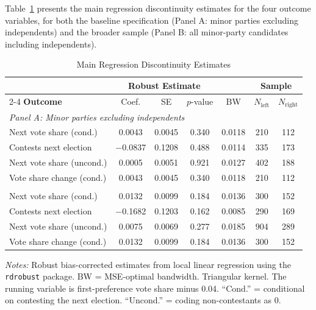 \documentclass[12pt, a4paper]{article}
\begin{document}
Table~\ref{tab:main_results} presents the main regression discontinuity estimates for the four outcome variables, for both the baseline specification (Panel A: minor parties excluding independents) and the broader sample (Panel B: all minor-party candidates including independents).

\begin{table}[H]
\centering
\caption{Main Regression Discontinuity Estimates}
\label{tab:main_results}
\small
\begin{tabular}{lcccccc}
\toprule
& \multicolumn{3}{c}{\textbf{Robust Estimate}} & & \multicolumn{2}{c}{\textbf{Sample}} \\
\cmidrule{2-4} \cmidrule{6-7}
\textbf{Outcome} & Coef. & SE & $p$-value & BW & $N_{\text{left}}$ & $N_{\text{right}}$ \\
\midrule
\multicolumn{7}{l}{\textit{Panel A: Minor parties excluding independents}} \\
\addlinespace
Next vote share (cond.) & 0.0043 & 0.0045 & 0.340 & 0.0118 & 210 & 112 \\
Contests next election & $-$0.0837 & 0.1208 & 0.488 & 0.0114 & 335 & 173 \\
Next vote share (uncond.) & 0.0005 & 0.0051 & 0.921 & 0.0127 & 402 & 188 \\
Vote share change (cond.) & 0.0043 & 0.0045 & 0.340 & 0.0118 & 210 & 112 \\
\addlinespace
\midrule
\multicolumn{7}{l}{\textit{Panel B: All minor parties including independents}} \\
\addlinespace
Next vote share (cond.) & 0.0132 & 0.0099 & 0.184 & 0.0136 & 300 & 152 \\
Contests next election & $-$0.1682 & 0.1203 & 0.162 & 0.0085 & 290 & 169 \\
Next vote share (uncond.) & 0.0075 & 0.0069 & 0.277 & 0.0185 & 904 & 289 \\
Vote share change (cond.) & 0.0132 & 0.0099 & 0.184 & 0.0136 & 300 & 152 \\
\bottomrule
\end{tabular}
\begin{minipage}{\textwidth}
\vspace{0.3em}
\footnotesize
\textit{Notes:} Robust bias-corrected estimates from local linear regression using the \texttt{rdrobust} package. BW = MSE-optimal bandwidth. Triangular kernel. The running variable is first-preference vote share minus 0.04. ``Cond.'' = conditional on contesting the next election. ``Uncond.'' = coding non-contestants as 0.
\end{minipage}
\end{table}
\end{document}
